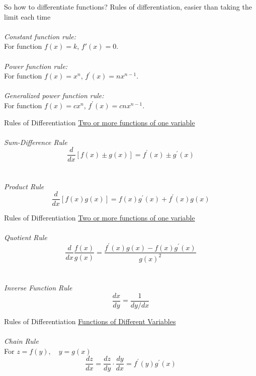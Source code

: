 \documentclass{./../../Latex/teaching_slides}
\begin{document}
\begin{frame}{So how to differentiate functions?}
Rules of differentiation, easier than taking the limit each time \\~\\
\textit{Constant function rule:}\\
For function \(f(x)=k \), $ f'(x)=0 $.\\~\\
\textit{Power function rule:}\\
For function \( f(x)=x^{n} \), \( f^{\prime}(x)=n x^{n-1} \).\\~\\
\textit{Generalized power function rule:}\\
For function \( f(x)=c x^{n} \), \( f^{\prime}(x)=c n x^{n-1} \).
\end{frame}

\begin{frame}{Rules of Differentiation}
\underline{Two or more functions of one variable} \\~\\ 
\textit{Sum-Difference Rule}
$$ \frac{d}{d x}[f(x) \pm g(x)]=f^{\prime}(x) \pm g^{\prime}(x) $$\\~\\

\textit{Product Rule} \\
$$
\frac{d}{d x}[f(x) g(x)]=f(x) g^{\prime}(x)+f^{\prime}(x) g(x)
$$
\end{frame}

\begin{frame}{Rules of Differentiation}
\underline{Two or more functions of one variable} \\~\\ 
\textit{Quotient Rule}\\
$$ \frac{d}{d x} \frac{f(x)}{g(x)}=\frac{f^{\prime}(x) g(x)-f(x) g^{\prime}(x)}{g(x)^2} $$\\~\\
\textit{Inverse Function Rule}
$$
\frac{d x}{d y}=\frac{1}{d y / d x}
$$

\end{frame}


\begin{frame}{Rules of Differentiation}
\underline{Functions of Different Variables} \\~\\
\textit{Chain Rule} \\
\vspace{0.5em}
For \( z=f(y), \quad y=g(x) \)
$$ \frac{d z}{d x}=\frac{d z}{d y} \cdot \frac{d y}{d x}=f^{\prime}(y) g^{\prime}(x) $$ \\~\\
\end{frame}
\end{document}
